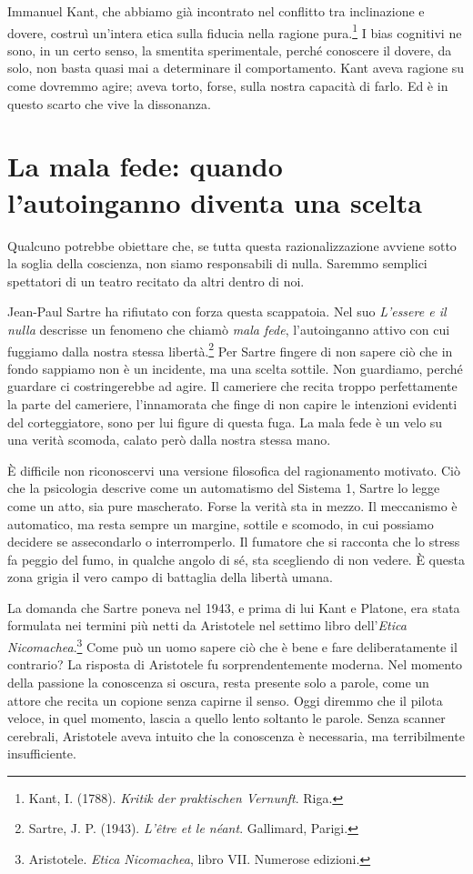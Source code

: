 Immanuel Kant, che abbiamo già incontrato nel conflitto tra inclinazione e dovere, costruì un'intera etica sulla fiducia nella ragione pura.\footnote{Kant, I. (1788). \textit{Kritik der praktischen Vernunft}. Riga.} I bias cognitivi ne sono, in un certo senso, la smentita sperimentale, perché conoscere il dovere, da solo, non basta quasi mai a determinare il comportamento. Kant aveva ragione su come dovremmo agire; aveva torto, forse, sulla nostra capacità di farlo. Ed è in questo scarto che vive la dissonanza.

\section{La mala fede: quando l'autoinganno diventa una scelta}
\label{sec:p1c7-mala-fede}

Qualcuno potrebbe obiettare che, se tutta questa razionalizzazione avviene sotto la soglia della coscienza, non siamo responsabili di nulla. Saremmo semplici spettatori di un teatro recitato da altri dentro di noi.

Jean-Paul Sartre ha rifiutato con forza questa scappatoia. Nel suo \textit{L'essere e il nulla} descrisse un fenomeno che chiamò \textit{mala fede}, l'autoinganno attivo con cui fuggiamo dalla nostra stessa libertà.\footnote{Sartre, J. P. (1943). \textit{L'être et le néant}. Gallimard, Parigi.} Per Sartre fingere di non sapere ciò che in fondo sappiamo non è un incidente, ma una scelta sottile. Non guardiamo, perché guardare ci costringerebbe ad agire. Il cameriere che recita troppo perfettamente la parte del cameriere, l'innamorata che finge di non capire le intenzioni evidenti del corteggiatore, sono per lui figure di questa fuga. La mala fede è un velo su una verità scomoda, calato però dalla nostra stessa mano.

È difficile non riconoscervi una versione filosofica del ragionamento motivato. Ciò che la psicologia descrive come un automatismo del Sistema 1, Sartre lo legge come un atto, sia pure mascherato. Forse la verità sta in mezzo. Il meccanismo è automatico, ma resta sempre un margine, sottile e scomodo, in cui possiamo decidere se assecondarlo o interromperlo. Il fumatore che si racconta che lo stress fa peggio del fumo, in qualche angolo di sé, sta scegliendo di non vedere. È questa zona grigia il vero campo di battaglia della libertà umana.

La domanda che Sartre poneva nel 1943, e prima di lui Kant e Platone, era stata formulata nei termini più netti da Aristotele nel settimo libro dell'\textit{Etica Nicomachea}.\footnote{Aristotele. \textit{Etica Nicomachea}, libro VII. Numerose edizioni.} Come può un uomo sapere ciò che è bene e fare deliberatamente il contrario? La risposta di Aristotele fu sorprendentemente moderna. Nel momento della passione la conoscenza si oscura, resta presente solo a parole, come un attore che recita un copione senza capirne il senso. Oggi diremmo che il pilota veloce, in quel momento, lascia a quello lento soltanto le parole. Senza scanner cerebrali, Aristotele aveva intuito che la conoscenza è necessaria, ma terribilmente insufficiente.

